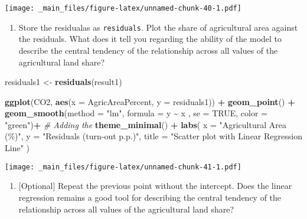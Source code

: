 \documentclass[
]{book}
\newenvironment{Shaded}{\begin{snugshade}}{\end{snugshade}}
\newcommand{\AttributeTok}[1]{\textcolor[rgb]{0.13,0.29,0.53}{#1}}
\newcommand{\CommentTok}[1]{\textcolor[rgb]{0.56,0.35,0.01}{\textit{#1}}}
\newcommand{\ConstantTok}[1]{\textcolor[rgb]{0.56,0.35,0.01}{#1}}
\newcommand{\FunctionTok}[1]{\textcolor[rgb]{0.13,0.29,0.53}{\textbf{#1}}}
\newcommand{\NormalTok}[1]{#1}
\newcommand{\OtherTok}[1]{\textcolor[rgb]{0.56,0.35,0.01}{#1}}
\newcommand{\SpecialCharTok}[1]{\textcolor[rgb]{0.81,0.36,0.00}{\textbf{#1}}}
\newcommand{\StringTok}[1]{\textcolor[rgb]{0.31,0.60,0.02}{#1}}
\providecommand{\tightlist}{%
  \setlength{\itemsep}{0pt}\setlength{\parskip}{0pt}}
\begin{document}
\texttt{[image: \_main\_files/figure-latex/unnamed-chunk-40-1.pdf]}

\begin{enumerate}
\def\labelenumi{\roman{enumi}.}
\tightlist
\item
  Store the residualas as \texttt{residuals}. Plot the share of agricultural area against the residuals. What does it tell you regarding the ability of the model to describe the central tendency of the relationship across all values of the agricultural land share?
\end{enumerate}

\begin{Shaded}
\begin{Highlighting}[]
\NormalTok{residuals1 }\OtherTok{\textless{}{-}} \FunctionTok{residuals}\NormalTok{(result1)}

\FunctionTok{ggplot}\NormalTok{(CO2, }\FunctionTok{aes}\NormalTok{(}\AttributeTok{x =}\NormalTok{ AgricAreaPercent, }\AttributeTok{y =}\NormalTok{ residuals1)) }\SpecialCharTok{+}
  \FunctionTok{geom\_point}\NormalTok{() }\SpecialCharTok{+}
  \FunctionTok{geom\_smooth}\NormalTok{(}\AttributeTok{method =} \StringTok{"lm"}\NormalTok{, }\AttributeTok{formula =}\NormalTok{ y }\SpecialCharTok{\textasciitilde{}}\NormalTok{ x , }\AttributeTok{se =} \ConstantTok{TRUE}\NormalTok{, }\AttributeTok{color =} \StringTok{"green"}\NormalTok{)}\SpecialCharTok{+}  \CommentTok{\# Adding the}
  \FunctionTok{theme\_minimal}\NormalTok{() }\SpecialCharTok{+}
  \FunctionTok{labs}\NormalTok{(}
    \AttributeTok{x =} \StringTok{"Agricultural Area (\%)"}\NormalTok{,}
    \AttributeTok{y =} \StringTok{"Residuals (turn{-}out p.p.)"}\NormalTok{,}
    \AttributeTok{title =} \StringTok{"Scatter plot with Linear Regression Line"}
\NormalTok{  )}
\end{Highlighting}
\end{Shaded}

\texttt{[image: \_main\_files/figure-latex/unnamed-chunk-41-1.pdf]}

\begin{enumerate}
\def\labelenumi{\roman{enumi}.}
\tightlist
\item
  {[}Optional{]} Repeat the previous point without the intercept. Does the linear regression remains a good tool for describing the central tendency of the relationship across all values of the agricultural land share?
\end{enumerate}
\end{document}
